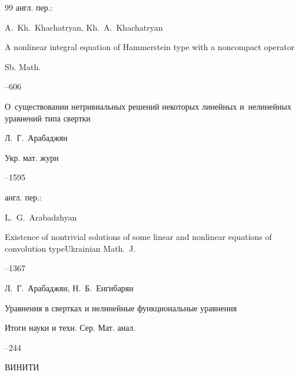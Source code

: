 \begin{thebibliography}{99}
\transl англ. пер.:~

\by A.~Kh.~Khachatryan, Kh.~A.~Khachatryan

\paper A nonlinear integral equation of Hammerstein type with a noncompact operator

\jour Sb. Math.




--606






\paper  О~существовании нетривиальных решений некоторых линейных и~нелинейных уравнений типа свертки

\by   Л.~Г.~Арабаджян

\jour Укр. мат. журн




--1595

\transl англ. пер.:~

\by L.~G.~Arabadzhyan 

\paper Existence of nontrivial solutions of some linear and nonlinear equations of convolution type\jour Ukrainian Math.~J.




–1367 








\by   Л.~Г.~Арабаджян, Н.~Б.~Енгибарян

\paper Уравнения в свертках и нелинейные функциональные уравнения

\serial Итоги науки и техн. Сер. Мат. анал.



--244

\publ ВИНИТИ


\end{thebibliography}
